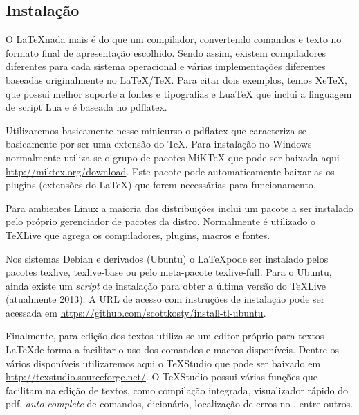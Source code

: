 \subsection{Instalação}
O \LaTeX nada mais é do que um compilador, convertendo comandos e texto no formato final de apresentação escolhido. Sendo assim, existem compiladores diferentes para cada sistema operacional e várias implementações diferentes baseadas originalmente no \LaTeX/\TeX. Para citar dois exemplos, temos Xe\TeX\cite{xetex}, que possui melhor suporte a fontes e tipografias e 
Lua\TeX\cite{luatex} que inclui a linguagem de script Lua e é baseada no \textsf{pdflatex}.

Utilizaremos basicamente nesse minicurso o \textsf{pdflatex} que caracteriza-se basicamente por ser uma extensão do \TeX. Para instalação no Windows normalmente utiliza-se o grupo de pacotes MiK\TeX\cite{miktex} que pode ser baixada aqui \url{http://miktex.org/download}. Este pacote pode automaticamente baixar as os plugins (extensões do \LaTeX) que forem necessárias para funcionamento.

Para ambientes Linux a maioria das distribuições inclui um pacote a ser instalado pelo próprio gerenciador de pacotes da distro. Normalmente é utilizado o \TeX Live que agrega os compiladores, plugins, macros e fontes.

Nos sistemas Debian e derivados (Ubuntu) o \LaTeX pode ser instalado pelos pacotes \textsf{texlive}, \textsf{texlive-base} ou pelo meta-pacote \textsf{texlive-full}. Para o Ubuntu, ainda existe um \textit{script} de instalação\cite{intall-tl-ubuntu} para obter a última versão do \TeX Live (atualmente 2013). A URL de acesso com instruções de instalação pode ser acessada em \url{https://github.com/scottkosty/install-tl-ubuntu}.

Finalmente, para edição dos textos utiliza-se um editor próprio para textos \LaTeX\space de forma a facilitar o uso dos comandos e macros disponíveis. Dentre os vários disponíveis\cite{wiki:texEditors} utilizaremos aqui o TeXStudio\cite{texstudio} que pode ser baixado em \url{http://texstudio.sourceforge.net/}. O TeXStudio possui várias funções que facilitam na edição de textos, como compilação integrada, visualizador rápido do pdf, \textit{auto-complete} de comandos, dicionário, localização de erros no \tex, entre outros.